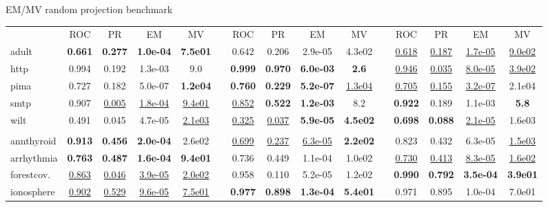 \documentclass[9pt]{beamer}
\begin{document}
\begin{frame}{EM/MV random projection benchmark}
\begin{table}[!ht]
{\begin{tabular}{l cccc c cccc c cccc}
~            & ROC  & PR   & EM    &  MV  &  & ROC  & PR   & EM    & MV     &  & ROC  & PR   & EM    & MV    \\
adult        &\bf 0.661 &\bf 0.277 &\bf 1.0e-04&\bf 7.5e01&  &0.642 &0.206 &2.9e-05& 4.3e02 &  &\underline{0.618} &\underline{0.187}&\underline{1.7e-05}&\underline{9.0e02} \\
http         &0.994 &0.192 &1.3e-03&9.0   &  &\bf 0.999 &\bf 0.970 &\bf 6.0e-03&\bf 2.6  &     &\underline{0.946} &\underline{0.035} &\underline{8.0e-05}&\underline{3.9e02} \\
pima         &0.727 &0.182 &5.0e-07&\bf 1.2e04&  &\bf 0.760 &\bf 0.229 &\bf 5.2e-07&\underline{1.3e04} &   &\underline{0.705} &\underline{0.155} &\underline{3.2e-07}&2.1e04 \\
smtp         &0.907 &\underline{0.005} &\underline{1.8e-04}&\underline{9.4e01}&  &\underline{0.852} &\bf 0.522 &\bf 1.2e-03&8.2    &   &\bf 0.922 &0.189 & 1.1e-03&\bf 5.8    \\
wilt         &0.491 &0.045 &4.7e-05&\underline{2.1e03} & &\underline{0.325} &\underline{0.037} &\bf 5.9e-05&\bf 4.5e02 &   &\bf 0.698 &\bf 0.088 &\underline{2.1e-05}&1.6e03 \\ 
 &&&&&&&&&&&&&& \\
annthyroid   &\bf 0.913 &\bf 0.456 &\bf 2.0e-04&2.6e02 & &\underline{0.699} &\underline{0.237} &\underline{6.3e-05}&\bf 2.2e02 &   &0.823 &0.432 &6.3e-05&\underline{1.5e03} \\
arrhythmia   &\bf 0.763 &\bf 0.487 &\bf 1.6e-04&\bf 9.4e01 & &0.736 &0.449 &1.1e-04&1.0e02   & &\underline{0.730} &\underline{0.413} &\underline{8.3e-05}&\underline{1.6e02} \\
forestcov.   &\underline{0.863} &\underline{0.046} &\underline{3.9e-05}&\underline{2.0e02}&  &0.958 &0.110 &5.2e-05&1.2e02  &  &\bf 0.990 &\bf 0.792 &\bf 3.5e-04&\bf 3.9e01 \\
ionosphere   &\underline{0.902} &\underline{0.529} &\underline{9.6e-05}&\underline{7.5e01} & &\bf 0.977 &\bf 0.898 &\bf 1.3e-04&\bf 5.4e01  &  &0.971 &0.895 &1.0e-04&7.0e01 \\

\end{tabular}}
\end{table}
\end{frame}
\end{document}
